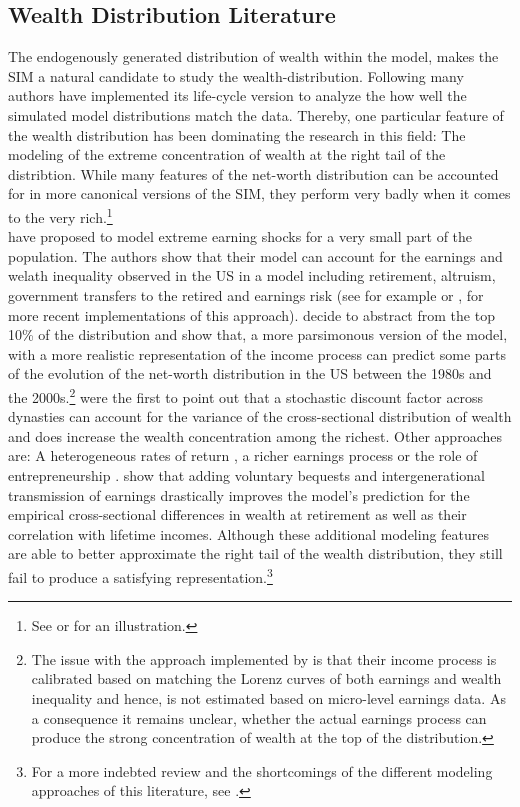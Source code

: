 \documentclass[12pt,a4paper,leqno]{article}
\theoremstyle{definition}
\begin{document}
\subsection{Wealth Distribution Literature}
The endogenously generated distribution of wealth within the model, makes the SIM a natural candidate to study the wealth-distribution.
Following \cite{huggett1996wealth} many authors have implemented its life-cycle version to analyze the how well the simulated model distributions match the data. Thereby, one particular feature of the wealth distribution has been dominating the research in this field: The modeling of the extreme concentration of wealth at the right tail of the distribtion. While many features of the net-worth distribution can be accounted for in more canonical versions of the SIM, they perform very badly when it comes to the very rich.\footnote{See \cite{huggett1996wealth} or \cite{quadrini1997understanding} for an illustration.} \\
\cite{castaneda2003} have proposed to model extreme earning shocks for a very small part of the population. The authors show that their model can account for the earnings and welath inequality observed in the US in a model including retirement, altruism, government transfers to the retired and earnings risk (see for example \citep{diaz2010} or \citep{kaymak2016evolution}, for more recent implementations of this approach).  \cite{hintermaier2011} decide to abstract from the top 10\% of the distribution and show that, a more parsimonous version of the model, with a more realistic representation of the income process can predict some parts of the evolution of the net-worth distribution in the US between the 1980s and the 2000s.\footnote{The issue with the approach implemented by \cite{castaneda2003} is that their income process is calibrated based on matching the Lorenz curves of both earnings and wealth inequality and hence, is not estimated based on micro-level earnings data. As a consequence it remains unclear, whether the actual earnings process can produce the strong concentration of wealth at the top of the distribution.} \cite{krusell1998} were the first to point out that a stochastic discount factor across dynasties can account for the variance of the cross-sectional distribution of wealth and does increase the wealth concentration among the richest. Other approaches are: A heterogeneous rates of return \cite{benhabib2011distribution}, a richer earnings process \citep{denardi2016}  or the role of entrepreneurship \citep{cagetti2009}. \cite{denardi2014} show that adding voluntary bequests and intergenerational transmission of earnings drastically improves the model's prediction for the empirical cross-sectional differences in wealth at retirement as well as their correlation with lifetime incomes.  Although these additional modeling features are able to better approximate the right tail of the wealth distribution, they still fail to produce a satisfying representation.\footnote{For a more indebted review and the shortcomings of the different modeling approaches of this literature, see \citep{denardi2017}.}  \\
\end{document}
